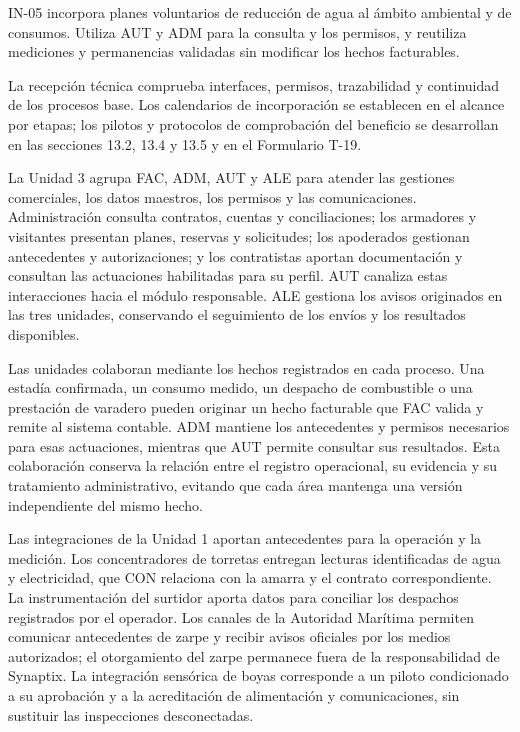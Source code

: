 IN-05 incorpora planes voluntarios de reducción de agua al ámbito ambiental y de consumos. Utiliza AUT y ADM para la consulta y los permisos, y reutiliza mediciones y permanencias validadas sin modificar los hechos facturables.

La recepción técnica comprueba interfaces, permisos, trazabilidad y continuidad de los procesos base. Los calendarios de incorporación se establecen en el alcance por etapas; los pilotos y protocolos de comprobación del beneficio se desarrollan en las secciones 13.2, 13.4 y 13.5 y en el Formulario T-19.

La Unidad 3 agrupa FAC, ADM, AUT y ALE para atender las gestiones
comerciales, los datos maestros, los permisos y las comunicaciones.
Administración consulta contratos, cuentas y conciliaciones;
los armadores y visitantes presentan planes, reservas y solicitudes;
los apoderados gestionan antecedentes y autorizaciones;
y los contratistas aportan documentación y consultan las actuaciones
habilitadas para su perfil. AUT canaliza estas interacciones
hacia el módulo responsable. ALE gestiona los avisos originados
en las tres unidades, conservando el seguimiento de los envíos
y los resultados disponibles.

Las unidades colaboran mediante los hechos registrados
en cada proceso. Una estadía confirmada, un consumo medido,
un despacho de combustible o una prestación de varadero
pueden originar un hecho facturable que FAC valida y remite
al sistema contable. ADM mantiene los antecedentes y permisos
necesarios para esas actuaciones, mientras que AUT permite
consultar sus resultados. Esta colaboración conserva la relación
entre el registro operacional, su evidencia y su tratamiento
administrativo, evitando que cada área mantenga una versión
independiente del mismo hecho.

Las integraciones de la Unidad 1 aportan antecedentes
para la operación y la medición. Los concentradores de torretas
entregan lecturas identificadas de agua y electricidad,
que CON relaciona con la amarra y el contrato correspondiente.
La instrumentación del surtidor aporta datos para conciliar
los despachos registrados por el operador. Los canales
de la Autoridad Marítima permiten comunicar antecedentes
de zarpe y recibir avisos oficiales por los medios autorizados;
el otorgamiento del zarpe permanece fuera de la responsabilidad
de Synaptix. La integración sensórica de boyas corresponde
a un piloto condicionado a su aprobación y a la acreditación
de alimentación y comunicaciones, sin sustituir las inspecciones
desconectadas.

